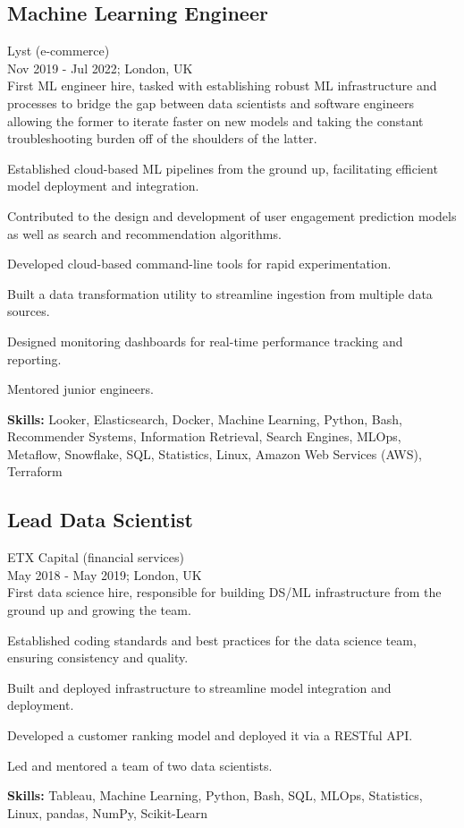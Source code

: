 \documentclass[a4paper,10pt]{article}
\begin{document}
\subsection*{Machine Learning Engineer}
Lyst (e-commerce) \\
Nov 2019 - Jul 2022; London, UK \\
First ML engineer hire, tasked with establishing robust ML infrastructure and processes to bridge the gap between data scientists and software engineers allowing the former to iterate faster on new models and taking the constant troubleshooting burden off of the shoulders of the latter.
\begin{bulletlist}
    \item Established cloud-based ML pipelines from the ground up, facilitating efficient model deployment and integration.
    \item Contributed to the design and development of user engagement prediction models as well as search and recommendation algorithms.
    \item Developed cloud-based command-line tools for rapid experimentation.
    \item Built a data transformation utility to streamline ingestion from multiple data sources.
    \item Designed monitoring dashboards for real-time performance tracking and reporting.
    \item Mentored junior engineers.
\end{bulletlist}
\textbf{Skills:} Looker, Elasticsearch, Docker, Machine Learning, Python, Bash, Recommender Systems, Information Retrieval, Search Engines, MLOps, Metaflow, Snowflake, SQL, Statistics, Linux, Amazon Web Services (AWS), Terraform

\subsection*{Lead Data Scientist}
ETX Capital (financial services) \\
May 2018 - May 2019; London, UK \\
First data science hire, responsible for building DS/ML infrastructure from the ground up and growing the team.
\begin{bulletlist}
    \item Established coding standards and best practices for the data science team, ensuring consistency and quality.
    \item Built and deployed infrastructure to streamline model integration and deployment.
    \item Developed a customer ranking model and deployed it via a RESTful API.
    \item Led and mentored a team of two data scientists.
\end{bulletlist}
\textbf{Skills: }Tableau, Machine Learning, Python, Bash, SQL, MLOps, Statistics, Linux, pandas, NumPy, Scikit-Learn
\end{document}
